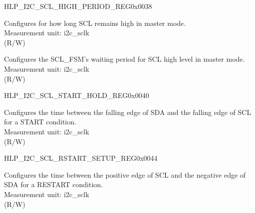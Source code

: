 \begin{register}{H}{LP\_I2C\_SCL\_HIGH\_PERIOD\_REG}{0x0038}\label{regdesc:LPI2CSCLHIGHPERIODREG}
%
%
%
\regnewline%
\begin{regdesc}\begin{reglist}
\label{fielddesc:LPI2CSCLHIGHPERIOD}\item [LP\_I2C\_SCL\_HIGH\_PERIOD] Configures for how long SCL remains high in master mode.\\
Measurement unit: i2c\_sclk \\ (R/W)
\label{fielddesc:LPI2CSCLWAITHIGHPERIOD}\item [LP\_I2C\_SCL\_WAIT\_HIGH\_PERIOD] Configures the SCL\_FSM's waiting period for SCL high level in master mode.\\
Measurement unit: i2c\_sclk \\ (R/W)
\end{reglist}\end{regdesc}
\end{register}


\begin{register}{H}{LP\_I2C\_SCL\_START\_HOLD\_REG}{0x0040}\label{regdesc:LPI2CSCLSTARTHOLDREG}
%
%
\regnewline%
\begin{regdesc}\begin{reglist}
\label{fielddesc:LPI2CSCLSTARTHOLDTIME}\item [LP\_I2C\_SCL\_START\_HOLD\_TIME] Configures the time between the falling edge of SDA and the falling edge of SCL for a START condition.\\
Measurement unit: i2c\_sclk \\ (R/W)
\end{reglist}\end{regdesc}
\end{register}


\begin{register}{H}{LP\_I2C\_SCL\_RSTART\_SETUP\_REG}{0x0044}\label{regdesc:LPI2CSCLRSTARTSETUPREG}
%
%
\regnewline%
\begin{regdesc}\begin{reglist}
\label{fielddesc:LPI2CSCLRSTARTSETUPTIME}\item [LP\_I2C\_SCL\_RSTART\_SETUP\_TIME] Configures the time between the positive edge of SCL and the negative edge of SDA for a RESTART condition.\\
Measurement unit: i2c\_sclk \\ (R/W)
\end{reglist}\end{regdesc}
\end{register}


